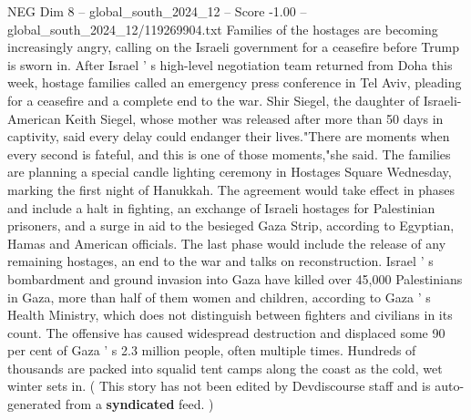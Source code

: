 \begin{textsample}{NEG Dim 8 – global\_south\_2024\_12 – Score -1.00 – global\_south\_2024\_12/119269904.txt}
Families of the hostages are becoming increasingly angry, calling on the Israeli government for a ceasefire before Trump is sworn in.
After Israel ' s high-level negotiation team returned from Doha this week, hostage families called an emergency press conference in Tel Aviv, pleading for a ceasefire and a complete end to the war.
Shir Siegel, the daughter of Israeli-American Keith Siegel, whose mother was released after more than 50 days in captivity, said every delay could endanger their lives."There are moments when every second is fateful, and this is one of those moments,"she said.
The families are planning a special candle lighting ceremony in Hostages Square Wednesday, marking the first night of Hanukkah.
The agreement would take effect in phases and include a halt in fighting, an exchange of Israeli hostages for Palestinian prisoners, and a surge in aid to the besieged Gaza Strip, according to Egyptian, Hamas and American officials.
The last phase would include the release of any remaining hostages, an end to the war and talks on reconstruction.
Israel ' s bombardment and ground invasion into Gaza have killed over 45,000 Palestinians in Gaza, more than half of them women and children, according to Gaza ' s Health Ministry, which does not distinguish between fighters and civilians in its count.
The offensive has caused widespread destruction and displaced some 90 per cent of Gaza ' s 2.3 million people, often multiple times.
Hundreds of thousands are packed into squalid tent camps along the coast as the cold, wet winter sets in. ( This story has not been edited by Devdiscourse staff and is auto-generated from a \textbf{syndicated} feed. )

\end{textsample}

